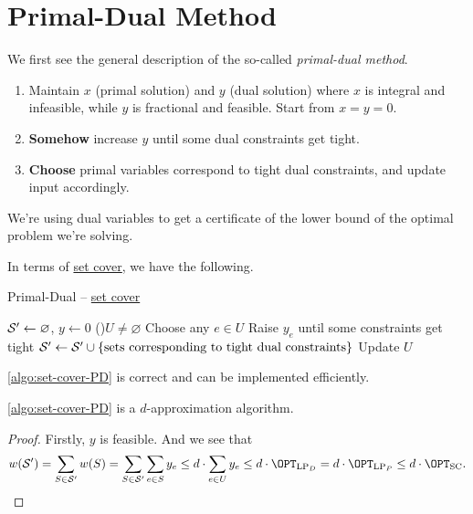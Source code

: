 \section{Primal-Dual Method}

We first see the general description of the so-called \emph{primal-dual method}.

\begin{enumerate}
	\item Maintain \(x\) (primal solution) and \(y\) (dual solution) where \(x\) is integral and infeasible, while \(y\) is fractional and feasible. Start from \(x = y = 0\).
	\item \textbf{Somehow} increase \(y\) until some dual constraints get tight.
	\item \textbf{Choose} primal variables correspond to tight dual constraints, and update input accordingly.
\end{enumerate}

\begin{remark}
	We're using dual variables to get a certificate of the lower bound of the optimal problem we're solving.
\end{remark}

In terms of \hyperref[prb:set-cover]{set cover}, we have the following.

\begin{algorithm}[H]\label{algo:set-cover-PD}
	\DontPrintSemicolon
	\caption{Primal-Dual -- \hyperref[prb:set-cover]{set cover}}
	\BlankLine

	\(\mathcal{\MakeUppercase{S}} ^\prime \gets \varnothing\), \(y \gets 0\)\;
	\While(){\(U \neq \varnothing \)}{
		Choose any \(e\in U\)\;
		Raise \(y_e\) until some constraints get tight\;
		\(\mathcal{\MakeUppercase{S}} ^\prime \gets \mathcal{\MakeUppercase{S}} ^\prime \cup \left\{ \text{sets corresponding to tight dual constraints} \right\} \)\;
		Update \(U\)
	}
	\;
\end{algorithm}

\begin{remark}
	\autoref{algo:set-cover-PD} is correct and can be implemented efficiently.
\end{remark}

\begin{theorem}
	\autoref{algo:set-cover-PD} is a \(d\)-approximation algorithm.
\end{theorem}
\begin{proof}
	Firstly, \(y\) is feasible. And we see that
	\[
		w(\mathcal{\MakeUppercase{S}} ^\prime ) = \sum_{S\in \mathcal{\MakeUppercase{S}} ^\prime } w(S) = \sum_{S\in \mathcal{\MakeUppercase{S}} ^\prime }\sum_{e\in S}y_e \leq d\cdot \sum_{e\in U} y_e \leq d\cdot \OPT_{\mathrm{LP}_{D}} = d\cdot \OPT_{\mathrm{LP}_P}\leq d\cdot \OPT_{\mathrm{SC} }.
	\]
\end{proof}